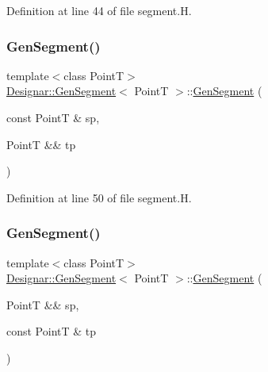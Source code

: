 Definition at line 44 of file segment.\+H.

\mbox{\label{class_designar_1_1_gen_segment_a504a48917f78ebaae01c2a1a598d1700}} 
\subsubsection{\texorpdfstring{Gen\+Segment()}{GenSegment()}\hspace{0.1cm}{\footnotesize\ttfamily [3/7]}}
{\footnotesize\ttfamily template$<$class PointT$>$ \\
\hyperlink{class_designar_1_1_gen_segment}{Designar\+::\+Gen\+Segment}$<$ PointT $>$\+::\hyperlink{class_designar_1_1_gen_segment}{Gen\+Segment} (\begin{DoxyParamCaption}\item[{const PointT \&}]{sp,  }\item[{PointT \&\&}]{tp }\end{DoxyParamCaption})\hspace{0.3cm}{\ttfamily [inline]}}



Definition at line 50 of file segment.\+H.

\mbox{\label{class_designar_1_1_gen_segment_a6190cba1e40d5d18dc1853368da957dc}} 
\subsubsection{\texorpdfstring{Gen\+Segment()}{GenSegment()}\hspace{0.1cm}{\footnotesize\ttfamily [4/7]}}
{\footnotesize\ttfamily template$<$class PointT$>$ \\
\hyperlink{class_designar_1_1_gen_segment}{Designar\+::\+Gen\+Segment}$<$ PointT $>$\+::\hyperlink{class_designar_1_1_gen_segment}{Gen\+Segment} (\begin{DoxyParamCaption}\item[{PointT \&\&}]{sp,  }\item[{const PointT \&}]{tp }\end{DoxyParamCaption})\hspace{0.3cm}{\ttfamily [inline]}}



